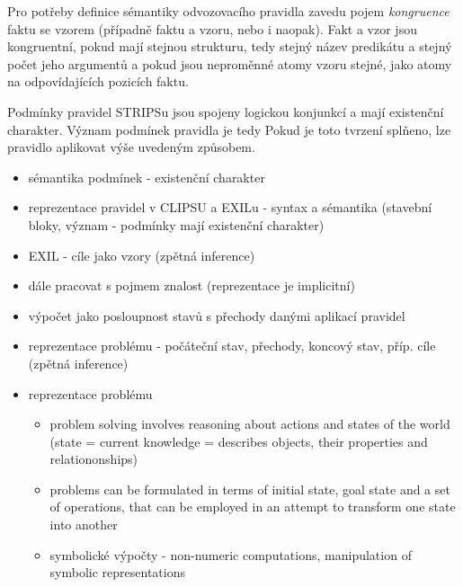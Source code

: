 Pro potřeby definice sémantiky odvozovacího pravidla zavedu pojem
\emph{kongruence} faktu se vzorem (případně faktu a vzoru, nebo i naopak). Fakt
a vzor jsou kongruentní, pokud mají stejnou strukturu, tedy stejný název
predikátu a stejný počet jeho argumentů a pokud jsou neproměnné atomy vzoru
stejné, jako atomy na odpovídajících pozicích faktu.

Podmínky pravidel STRIPSu jsou spojeny logickou konjunkcí a mají existenční
charakter. Význam podmínek pravidla je tedy  Pokud je toto tvrzení splňeno, lze pravidlo aplikovat výše
uvedeným způsobem.

\begin{framed}
  \begin{itemize}
    \item sémantika podmínek - existenční charakter
    \item reprezentace pravidel v CLIPSU a EXILu - syntax a sémantika
      (stavební bloky, význam - podmínky mají existenční charakter)
    \item EXIL - cíle jako vzory (zpětná inference)
    \item dále pracovat s pojmem znalost (reprezentace je implicitní)
    \item výpočet jako posloupnost stavů s přechody danými aplikací pravidel
    \item reprezentace problému - počáteční stav, přechody, koncový stav,
      příp. cíle (zpětná inference)
    \item reprezentace problému
      \begin{itemize}
        \item problem solving involves reasoning about actions and states of the
          world (state = current knowledge = describes objects, their properties and
          relationonships)
        \item problems can be formulated in terms of initial state, goal state
          and a set of operations, that can be employed in an attempt to
          transform one state into another
        \item symbolické výpočty - non-numeric computations, manipulation of
          symbolic representations
      \end{itemize}
  \end{itemize}
\end{framed}
